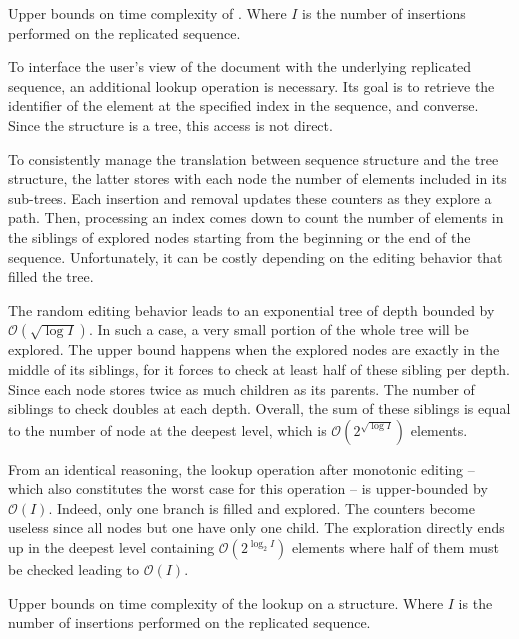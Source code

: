 \begin{table}
  \caption{\label{table:lseqtime}
    Upper bounds on time complexity of \LSEQ. Where $I$ is the number of 
    insertions performed on the replicated sequence.}
  \centering
  
\end{table}

To interface the user's view of the document with the underlying replicated
sequence, an additional lookup operation is necessary. Its goal is to retrieve
the identifier of the element at the specified index in the sequence, and
converse. Since the structure is a tree, this access is not direct.

To consistently manage the translation between sequence structure and the tree
structure, the latter stores with each node the number of elements included in
its sub-trees. Each insertion and removal updates these counters as they explore
a path. Then, processing an index comes down to count the number of elements in
the siblings of explored nodes starting from the beginning or the end of the
sequence. Unfortunately, it can be costly depending on the editing behavior that
filled the tree.

The random editing behavior leads to an exponential tree of depth bounded by
$\mathcal{O}(\sqrt{\log I})$. In such a case, a very small portion of the whole
tree will be explored. The upper bound happens when the explored nodes are
exactly in the middle of its siblings, for it forces to check at least half of
these sibling per depth. Since each node stores twice as much children as its
parents. The number of siblings to check doubles at each depth. Overall, the sum
of these siblings is equal to the number of node at the deepest level, which is
$\mathcal{O}(2^{\sqrt{\log I}})$ elements. 

From an identical reasoning, the lookup operation after monotonic editing --
which also constitutes the worst case for this operation -- is upper-bounded by
$\mathcal{O}(I)$. Indeed, only one branch is filled and explored. The counters
become useless since all nodes but one have only one child. The exploration
directly ends up in the deepest level containing $\mathcal{O}(2^{\log_2 I})$
elements where half of them must be checked leading to
$\mathcal{O}(I)$.

\begin{table}
  \caption{\label{table:lseqlookup}
    Upper bounds on time complexity of the lookup on a \LSEQ structure.
    Where $I$ is the number of insertions performed on the replicated sequence.}
  \centering
  
\end{table}

